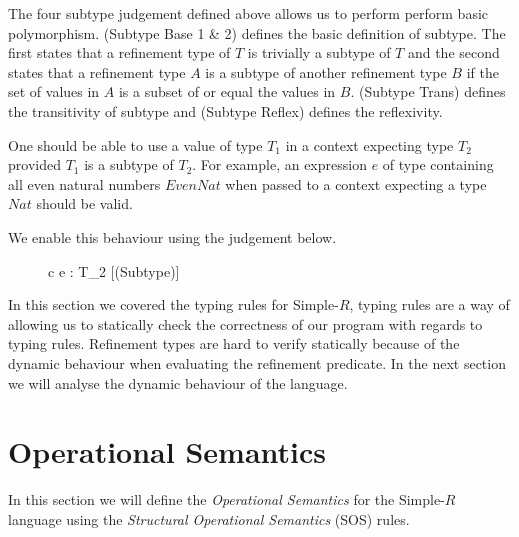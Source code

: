\documentclass[a4paper,12pt]{report}
\begin{document}
\par
The four subtype judgement defined above allows us to perform perform basic 
polymorphism. (Subtype Base 1 & 2) defines the basic definition of subtype. The 
first states that a refinement type of $T$ is trivially a subtype of $T$ and the 
second states that a refinement type $A$ is a subtype of another 
refinement type $B$ if the set of values in $A$ is a subset of or equal 
the values in $B$. (Subtype Trans) defines the transitivity of subtype and 
(Subtype Reflex) defines the reflexivity. 

\par
One should be able to use a value of type $T_1$ in a context 
expecting type $T_2$ provided $T_1$ is a subtype of $T_2$. For example, an 
expression $e$ of type containing all even natural numbers $EvenNat$ when passed 
to a context expecting a type $Nat$ should be valid. 

\par
We enable this behaviour using the judgement below.
\begin{figure}[H]
  \begin{center}
    \begin{tabular} {c}
      {\Gamma \vdash e : T_2} [(Subtype)]
    \end{tabular}
  \end{center}
\end{figure}

\par
In this section we covered the typing rules for Simple-$R$, typing rules are a 
way of allowing us to statically check the correctness of our program with 
regards to typing rules. Refinement types are hard to verify statically because 
of the dynamic behaviour when evaluating the refinement predicate. In the next 
section we will analyse the dynamic behaviour of the language. 

\section{Operational Semantics}
In this section we will define the \textit{Operational Semantics} 
\cite{operationalSemantics} for the Simple-$R$ language 
using the \textit{Structural Operational Semantics} \cite{plotkinSOS} (SOS) rules.
\end{document}
